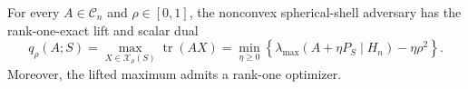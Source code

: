 For every \(A\in\mathcal C_n\) and \(\rho\in[0,1]\), the nonconvex spherical-shell adversary has the rank-one-exact lift and scalar dual \[q_\rho(A;S)=\max_{X\in\mathcal X_\rho(S)}\operatorname{tr}(AX)=\min_{\eta\geq0}\left\{\lambda_{\max}(A+\eta P_S\mid H_n)-\eta\rho^2\right\}.\] Moreover, the lifted maximum admits a rank-one optimizer.
